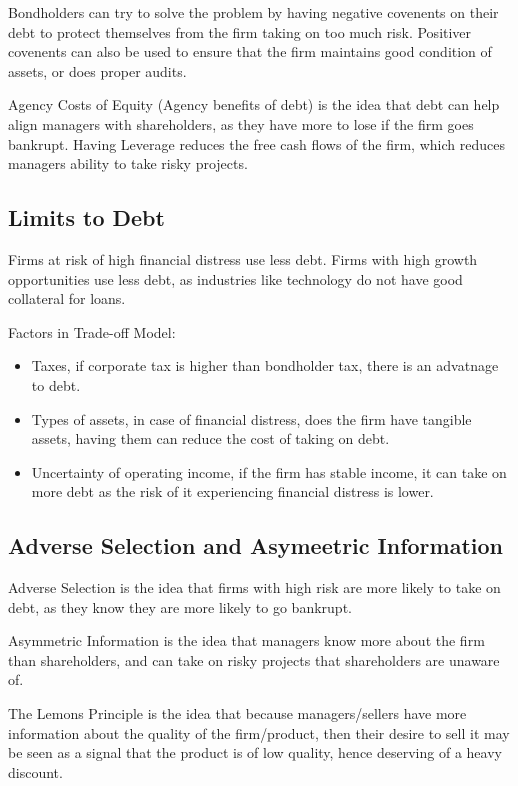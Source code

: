 Bondholders can try to solve the problem by having negative covenents on their debt to protect 
themselves from the firm taking on too much risk. Positiver covenents can also be used to ensure that the firm
maintains good condition of assets, or does proper audits.

Agency Costs of Equity (Agency benefits of debt) is the idea that debt can help align managers with shareholders, as they have more to lose if the firm goes bankrupt.
Having Leverage reduces the free cash flows of the firm, which reduces managers ability to take
risky projects.

\subsection{Limits to Debt}
Firms at risk of high financial distress use less debt.
Firms with high growth opportunities use less debt, as industries like technology
do not have good collateral for loans.

Factors in Trade-off Model:
\begin{itemize}
    \item Taxes, if corporate tax is higher than bondholder tax, there is an advatnage to debt.
    \item Types of assets, in case of financial distress, does the firm have tangible assets, having them can reduce the cost of taking on debt.
    \item Uncertainty of operating income, if the firm has stable income, it can take on more debt as the risk of it experiencing financial distress is lower.
\end{itemize}

\subsection{Adverse Selection and Asymeetric Information}
Adverse Selection is the idea that firms with high risk are more 
likely to take on debt, as they know they are more likely to go bankrupt.

Asymmetric Information is the idea that managers know more about the 
firm than shareholders, and can take on risky projects that shareholders are unaware of.

The Lemons Principle is the idea that because managers/sellers have more information about
the quality of the firm/product, then their desire to sell it may be seen
as a signal that the product is of low quality, hence deserving of a heavy discount.

